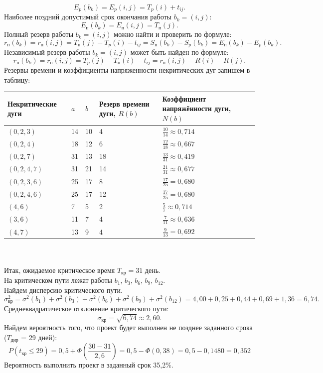 \documentclass[a4paper, 12pt]{report}
\renewcommand{\leq}{\leqslant}
\begin{document}
	$$E_p(b_k)=E_p(i,j)=T_p(i)+t_{ij}.$$
	Наиболее поздний допустимый срок окончания работы $b_k=(i,j)$:
	$$E_\text{п}(b_k)=E_\text{п}(i,j)=T_\text{п}(j).$$
	Полный резерв работы $b_k=(i,j)$ можно найти и проверить по формуле:
	$$r_\text{п}(b_k)=r_\text{п}(i,j)=T_\text{п}(j)-T_p(i)-t_{ij}=S_\text{п}(b_k)-S_p(b_k)=E_\text{п}(b_k)-E_p(b_k).$$
	Независимый резерв работы $b_k=(i,j)$ может быть найден по формуле:
	$$r_\text{н}(b_k)=r_\text{н}(i,j)=T_p(j)-T_\text{п}(i)-t_{ij}=r_\text{п}(i,j)-R(i)-R(j).$$
	Резервы времени и коэффициенты напряженности некритических
	дуг запишем в таблицу:
	\begin{tabular}{ |p{3cm}||p{1cm}||p{1cm}||p{4cm}||p{4cm}|}
		\hline
		Некритические дуги& $a$ & $b$ & Резерв времени дуги, $R(b)$ & Коэффициент напряжённости дуги, $N(b)$\\
		\hline
		$(0,2,3)$ & 14 & 10 & 4 & $\frac{10}{14}\approx 0,714$\\
		$(0,2,4)$&18&12&6&$\frac{12}{18}\approx0,667$\\
		$(0,2,7)$&31&13&18&$\frac{13}{31}\approx0,419$\\
		$(0,2,4,7)$&31&21&14&$\frac{21}{31}\approx0,677$\\
		$(0,2,3,6)$&25&17&8&$\frac{17}{25}=0,680$\\
		$(0,2,4,6)$&25&17&12&$\frac{17}{25}=0,680$\\
		$(4,6)$&7&5&2&$\frac{5}{7}\approx0,714$\\
		$(3,6)$&11&7&4&$\frac{7}{11}\approx0,636$\\
		$(4,7)$&13&9&4&$\frac{9}{13}=0,692$\\
		\hline
	\end{tabular}\\\\
	Итак, ожидаемое критическое время $T_\text{кр}= 31$ день.\\
	На критическом пути лежат работы $b_1$, $b_3$, $b_6$, $b_9$, $b_{12}$.\\
	Найдем дисперсию критического пути.\\
	$$\sigma_\text{кр}^2=\sigma^2(b_1)+\sigma^2(b_3)+\sigma^2(b_6)+\sigma^2(b_9)+\sigma^2(b_{12})=4,00+0,25+0,44+0,69+1,36=6,74.$$
	Среднеквадратическое отклонение критического пути:
	$$\sigma_\text{кр}=\sqrt{6,74}\approx 2,60.$$
	Найдем вероятность того, что проект будет выполнен не позднее
	заданного срока ($T_\text{дир}$ = 29 дней): 
	$$P(t_\text{кр}\leq 29)=0,5+\Phi\left(\frac{30-31}{2,6}\right)=0,5-\Phi(0,38)=0,5-0,1480=0,352$$
	Вероятность выполнить проект в заданный срок 35,2\%.\\
\end{document}
